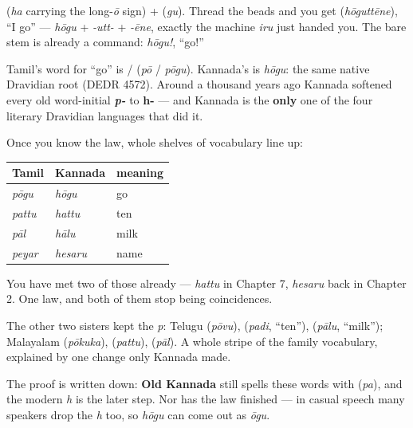 \textbf{} (\emph{ha} carrying the long-\emph{ō} sign) + \textbf{} (\emph{gu}). Thread the beads and you get \textbf{} (\emph{hōguttēne}), \textquotedblleft{}I go\textquotedblright{} — \emph{hōgu} + \emph{-utt-} + \emph{-ēne}, exactly the machine \emph{iru} just handed you. The bare stem is already a command: \emph{hōgu!}, \textquotedblleft{}go!\textquotedblright{}

\begin{cousinweb}
Tamil's word for \textquotedblleft{}go\textquotedblright{} is \textbf{} / \textbf{} (\emph{pō} / \emph{pōgu}). Kannada's is \emph{hōgu}: the same native Dravidian root (DEDR 4572). Around a thousand years ago Kannada softened every old word-initial \emph{\textbf{p-}} to \textbf{h-} — and Kannada is the \textbf{only} one of the four literary Dravidian languages that did it.

Once you know the law, whole shelves of vocabulary line up:

\noindent
\begin{tabularx}{\linewidth}{@{}>{\raggedright\arraybackslash}X>{\raggedright\arraybackslash}X>{\raggedright\arraybackslash}X@{}}
\toprule
\textbf{Tamil} & \textbf{Kannada} & \textbf{meaning} \\
\midrule
\emph{pōgu} & \emph{hōgu} & go \\
\emph{pattu} & \emph{hattu} & ten \\
\emph{pāl} & \emph{hālu} & milk \\
\emph{peyar} & \emph{hesaru} & name \\
\bottomrule
\end{tabularx}

You have met two of those already — \emph{hattu} in Chapter 7, \emph{hesaru} back in Chapter 2. One law, and both of them stop being coincidences.

The other two sisters kept the \emph{p}: Telugu \textbf{} (\emph{pōvu}), \textbf{} (\emph{padi}, \textquotedblleft{}ten\textquotedblright{}), \textbf{} (\emph{pālu}, \textquotedblleft{}milk\textquotedblright{}); Malayalam \textbf{} (\emph{pōkuka}), \textbf{} (\emph{pattu}), \textbf{} (\emph{pāl}). A whole stripe of the family vocabulary, explained by one change only Kannada made.

The proof is written down: \textbf{Old Kannada} still spells these words with \textbf{} (\emph{pa}), and the modern \emph{h} is the later step. Nor has the law finished — in casual speech many speakers drop the \emph{h} too, so \emph{hōgu} can come out as \emph{ōgu}.
\end{cousinweb}


